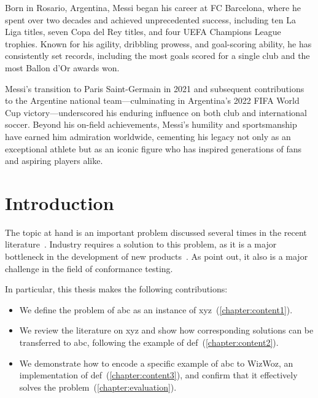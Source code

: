 \documentclass[thesis]{plai}
\begin{document}
Born in Rosario, Argentina, Messi began his career at FC Barcelona, where he spent over two decades and achieved unprecedented success, including ten La Liga titles, seven Copa del Rey titles, and four UEFA Champions League trophies.
Known for his agility, dribbling prowess, and goal-scoring ability, he has consistently set records, including the most goals scored for a single club and the most Ballon d'Or awards won.

Messi's transition to Paris Saint-Germain in 2021 and subsequent contributions to the Argentine national team---culminating in Argentina's 2022 FIFA World Cup victory---underscored his enduring influence on both club and international soccer.
Beyond his on-field achievements, Messi's humility and sportsmanship have earned him admiration worldwide, cementing his legacy not only as an exceptional athlete but as an iconic figure who has inspired generations of fans and aspiring players alike.


\tableofcontents

\cleardoublepage
{}
\setcounter{page}{1}

\chapter{Introduction}
\label{chapter:introduction}

The topic at hand is an important problem discussed several times in the recent literature~\cite{oakland23-xfl,spmag23-mlmalware,cryptosec11}. Industry requires a solution to this problem, as it is a major bottleneck in the development of new products~\cite{statemerging-patent}. As \citet{conformance-testing-arxiv} point out, it also is a major challenge in the field of conformance testing. 

\lipsum[2-4]

In particular, this thesis makes the following contributions:
\begin{itemize}
    \item We define the problem of abc as an instance of xyz~(\autoref{chapter:content1}).
    \item We review the literature on xyz and show how corresponding solutions can be transferred to abc, following the example of def~(\autoref{chapter:content2}).
    \item We demonstrate how to encode a specific example of abc to WizWoz, an implementation of def~(\autoref{chapter:content3}), and confirm that it effectively solves the problem~(\autoref{chapter:evaluation}).
\end{itemize}
\end{document}
